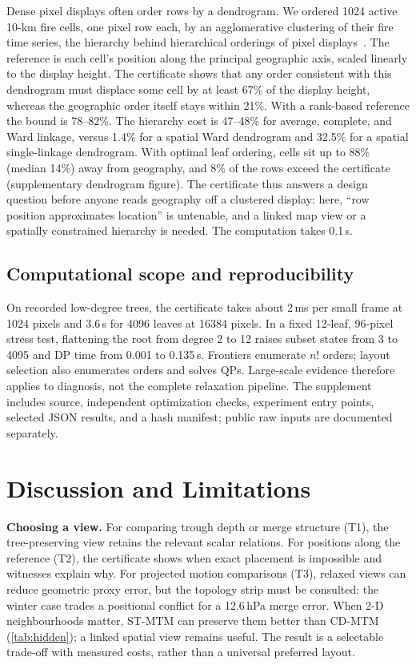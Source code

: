 \documentclass[review]{vgtc}                 %
\begin{document}
Dense pixel displays often order rows by a dendrogram. We ordered 1024 active 10-km fire cells, one pixel row each, by an agglomerative clustering of their fire time series, the hierarchy behind hierarchical orderings of pixel displays~\cite{Franke:2021:1DP}. The reference is each cell's position along the principal geographic axis, scaled linearly to the display height. The certificate shows that any order consistent with this dendrogram must displace some cell by at least 67\% of the display height, whereas the geographic order itself stays within 21\%. With a rank-based reference the bound is 78--82\%. The hierarchy cost is 47--48\% for average, complete, and Ward linkage, versus 1.4\% for a spatial Ward dendrogram and 32.5\% for a spatial single-linkage dendrogram. With optimal leaf ordering, cells sit up to 88\% (median 14\%) away from geography, and 8\% of the rows exceed the certificate (supplementary dendrogram figure). The certificate thus answers a design question before anyone reads geography off a clustered display: here, ``row position approximates location'' is untenable, and a linked map view or a spatially constrained hierarchy is needed. The computation takes 0.1\,s.

\subsection{Computational scope and reproducibility}
On recorded low-degree trees, the certificate takes about 2\,ms per small frame at 1024 pixels and 3.6\,s for 4096 leaves at 16384 pixels. In a fixed 12-leaf, 96-pixel stress test, flattening the root from degree 2 to 12 raises subset states from 3 to 4095 and DP time from 0.001 to 0.135\,s. Frontiers enumerate $n!$ orders; layout selection also enumerates orders and solves QPs. Large-scale evidence therefore applies to diagnosis, not the complete relaxation pipeline. The supplement includes source, independent optimization checks, experiment entry points, selected JSON results, and a hash manifest; public raw inputs are documented separately.

\section{Discussion and Limitations}\label{sec:discussion}

\textbf{Choosing a view.} For comparing trough depth or merge structure (T1), the tree-preserving view retains the relevant scalar relations. For positions along the reference (T2), the certificate shows when exact placement is impossible and witnesses explain why. For projected motion comparisons (T3), relaxed views can reduce geometric proxy error, but the topology strip must be consulted: the winter case trades a positional conflict for a 12.6\,hPa merge error. When 2-D neighbourhoods matter, ST-MTM can preserve them better than CD-MTM (\cref{tab:hidden}); a linked spatial view remains useful. The result is a selectable trade-off with measured costs, rather than a universal preferred layout.
\end{document}
